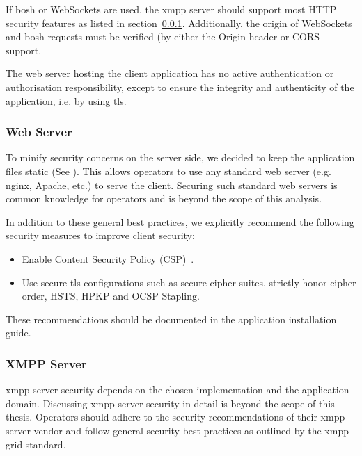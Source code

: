 If \gls{bosh} or WebSockets are used, the \gls{xmpp} server should support most HTTP security features as listed in section~\ref{sec:web-server}. Additionally, the origin of WebSockets and \gls{bosh} requests must be verified (by either the Origin header or CORS support.~\cite{rfc6455}\cite{cross-origin-resource-sharing}

The web server hosting the client application has no active authentication or authorisation responsibility, except to ensure the integrity and authenticity of the application, i.e. by using \gls{tls}.

\subsubsection{Web Server}\label{sec:web-server}

To minify security concerns on the server side, we decided to keep the application files static (See ).
This allows operators to use any standard web server (e.g. nginx, Apache, etc.) to serve the client.
Securing such standard web servers is common knowledge for operators and is beyond the scope of this analysis.

In addition to these general best practices, we explicitly recommend the following security measures to improve client security:

\begin{itemize}
    \item Enable Content Security Policy (CSP)~\cite{w3c-csp}.
    \item Use secure \gls{tls} configurations such as secure cipher suites, strictly honor cipher order, HSTS, HPKP and OCSP Stapling\cite{mozilla-tls-recommendations}.
\end{itemize}

These recommendations should be documented in the application installation guide.

\subsubsection{XMPP Server}

\gls{xmpp} server security depends on the chosen implementation and the application domain.
Discussing \gls{xmpp} server security in detail is beyond the scope of this thesis.
Operators should adhere to the security recommendations of their \gls{xmpp} server vendor and follow general security best practices as outlined by the \gls{xmpp-grid-standard}.

